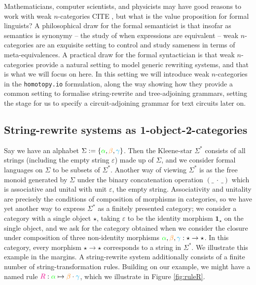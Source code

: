 \begin{fullwidth}
Mathematicians, computer scientists, and physicists may have good reasons to work with weak $n$-categories \bR CITE \e, but what is the value proposition for formal linguists? A philosophical draw for the formal semanticist is that insofar as semantics is synonymy -- the study of when expressions are equivalent -- weak $n$-categories are an exquisite setting to control and study sameness in terms of meta-equivalences. A practical draw for the formal syntactician is that weak $n$-categories provide a natural setting to model generic rewriting systems, and that is what we will focus on here. In this setting we will introduce weak $n$-categories in the \texttt{homotopy.io} formulation, along the way showing how they provide a common setting to formalise string-rewrite and tree-adjoining grammars, setting the stage for us to specify a circuit-adjoining grammar for text circuits later on. 
\end{fullwidth}

\subsection{String-rewrite systems as 1-object-2-categories}

Say we have an alphabet $\Sigma := \{\textcolor{green}{\alpha}, \textcolor{orange}{\beta}, \textcolor{cyan}{\gamma}\}$. Then the Kleene-star $\Sigma^*$ consists of all strings (including the empty string $\varepsilon$) made up of $\Sigma$, and we consider formal languages on $\Sigma$ to be subsets of $\Sigma^*$. Another way of viewing $\Sigma^*$ is as the free monoid generated by $\Sigma$ under the binary concatenation operation $(\_ \ \cdot \ \_)$ which is associative and unital with unit $\varepsilon$, the empty string. Associativity and unitality are precisely the conditions of composition of morphisms in categories, so we have yet another way to express $\Sigma^*$ as a finitely presented category; we consider a category with a single object $\star$, taking $\varepsilon$ to be the identity morphism $\textbf{1}_\star$ on the single object, and we ask for the category obtained when we consider the closure under composition of three non-identity morphisms $\textcolor{green}{\alpha}, \textcolor{orange}{\beta}, \textcolor{cyan}{\gamma}: \star \rightarrow \star$. In this category, every morphism $\star \rightarrow \star$ corresponds to a string in $\Sigma^*$. We illustrate this example in the margins. A string-rewrite system additionally consists of a finite number of string-transformation rules. Building on our example, we might have a named rule $\textcolor{magenta}{R}: \textcolor{green}{\alpha} \mapsto \textcolor{orange}{\beta} \cdot \textcolor{cyan}{\gamma}$, which we illustrate in Figure \ref{fig:ruleR}.\\

